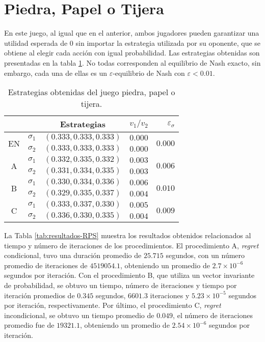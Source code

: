 \section*{Piedra, Papel o Tijera}

En este juego, al igual que en el anterior, ambos jugadores pueden garantizar una utilidad esperada de $0$ sin importar la estrategia utilizada por su oponente, que se obtiene al elegir cada acción con igual probabilidad. Las estrategias obtenidas son presentadas en la tabla \ref{tab:estrategias-RPS}. No todas corresponden al equilibrio de Nash exacto, sin embargo, cada una de ellas es un $\varepsilon$-equilibrio de Nash con $\varepsilon < 0.01$.

\begin{table}[h]
    \centering
    \caption{Estrategias obtenidas del juego piedra, papel o tijera.}
    \label{tab:estrategias-RPS}
    \begin{tabular}{c c c r r}
        \toprule
        & & Estrategias & $v_1 / v_2$ & $\varepsilon_{\sigma}$ \\
        \midrule
        \multirow{2}{*}{EN}
        & $\sigma_1$ & $(0.333, 0.333, 0.333)$ & $0.000$ & \multirow{2}{*}{$0.000$}\\
        & $\sigma_2$ & $(0.333, 0.333, 0.333)$ &  $0.000$ & \\
        \hline
        \multirow{2}{*}{A}
        & $\sigma_1$ & $(0.332, 0.335, 0.332)$ & $0.003$ & \multirow{2}{*}{$0.006$}\\
        & $\sigma_2$ & $(0.331, 0.334, 0.335)$ & $0.003$ & \\
        \hline
        \multirow{2}{*}{B}
        & $\sigma_1$ & $(0.330, 0.334, 0.336)$ & $0.006$ & \multirow{2}{*}{$0.010$}\\
        & $\sigma_2$ & $(0.329, 0.335, 0.337)$ & $0.004$ & \\
        \hline
        \multirow{2}{*}{C}
        & $\sigma_1$ & $(0.333, 0.337, 0.330)$ & $0.005$ & \multirow{2}{*}{$0.009$} \\
        & $\sigma_2$ &$(0.336, 0.330, 0.335)$  & $0.004$ & \\
        \bottomrule
    \end{tabular}
\end{table}

La Tabla \ref{tab:resultados-RPS} muestra los resultados obtenidos relacionados al tiempo y número de iteraciones de los procedimientos. El procedimiento A, \textit{regret} condicional, tuvo una duración promedio de $25.715$ segundos, con un número promedio de iteraciones de $4519054.1$, obteniendo un promedio de $2.7 {\times} 10^{-6}$ segundos por iteración. Con el procedimiento B, que utiliza un vector invariante de probabilidad, se obtuvo un tiempo, número de iteraciones y tiempo por iteración promedios de $0.345$ segundos, $6601.3$ iteraciones y $5.23 {\times} 10^{-5}$ segundos por iteración, respectivamente. Por último, el procedimiento C, \textit{regret} incondicional, se obtuvo un tiempo promedio de $0.049$, el número de iteraciones promedio fue de $19321.1$, obteniendo un promedio de $2.54 {\times} 10^{-6}$ segundos por iteración.

